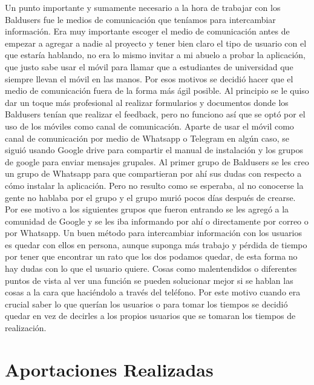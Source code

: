Un punto importante y sumamente necesario a la hora de trabajar con los Baldusers fue le medios de comunicación que teníamos para intercambiar información.
Era muy importante escoger el medio de comunicación antes de empezar a agregar a nadie al proyecto y tener bien claro el tipo de usuario con el que estaría hablando, no era lo mismo invitar a mi abuelo a probar la aplicación, que justo sabe usar el móvil para llamar que a estudiantes de universidad que siempre llevan el móvil en las manos.
Por esos motivos se decidió hacer que el medio de comunicación fuera de la forma más ágil posible.
Al principio se le quiso dar un toque más profesional al realizar formularios y documentos donde los Baldusers tenían que realizar el feedback, pero no funciono así que se optó por el uso de los móviles como canal de comunicación.
Aparte de usar el móvil como canal de comunicación por medio de Whatsapp o Telegram en algún caso, se siguió usando Google drive para compartir el manual de instalación y los grupos de google para enviar mensajes grupales.
Al primer grupo de Baldusers se les creo un grupo de Whatsapp para que compartieran por ahí sus dudas con respecto a cómo instalar la aplicación. Pero no resulto como se esperaba, al no conocerse la gente no hablaba por el grupo y el grupo murió pocos días después de crearse.
Por ese motivo a los siguientes grupos que fueron entrando se les agregó a la comunidad de Google y se les iba informando por ahí o directamente por correo o por Whatsapp.
Un buen método para intercambiar información con los usuarios es quedar con ellos en persona, aunque suponga más trabajo y pérdida de tiempo por tener que encontrar un rato que los dos podamos quedar, de esta forma no hay dudas con lo que el usuario quiere.
Cosas como malentendidos o diferentes puntos de vista al ver una función se pueden solucionar mejor si se hablan las cosas a la cara que haciéndolo a través del teléfono.
Por este motivo cuando era crucial saber lo que querían los usuarios o para tomar los tiempos se decidió quedar en vez de decirles a los propios usuarios que se tomaran los tiempos de realización.


\section{Aportaciones Realizadas}
\label{secc:aportaciones Realizadas}

